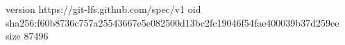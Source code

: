 version https://git-lfs.github.com/spec/v1
oid sha256:f60b8736c757a25543667e5e082500d13bc2fc19046f54fae400039b37d259ee
size 87496
